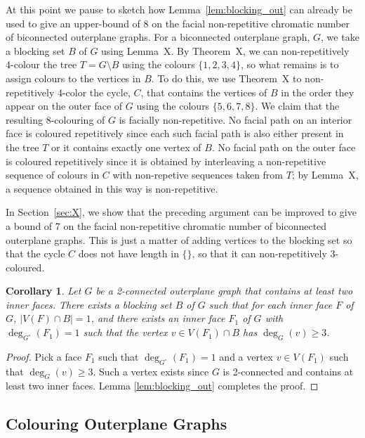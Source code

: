 \documentclass{patmorin}
\newcommand{\wdual}[1]{#1^{\circ}}
\newtheorem{corollary}[theorem]{Corollary}
\begin{document}
At this point we pause to sketch how Lemma~\ref{lem:blocking_out}
can already be used to give an upper-bound of 8 on the facial
non-repetitive chromatic number of biconnected outerplane graphs.
For a biconnected outerplane graph, $G$, we take a blocking set $B$
of $G$ using Lemma~X.  By Theorem~X, we can non-repetitively 4-colour the tree
$T=G\setminus B$ using the colours $\{1,2,3,4\}$, so what remains is to assign
colours to the vertices in $B$.  To do this, we use Theorem~X to non-repetitively 4-color
the cycle, $C$, that contains the vertices of $B$ in the order they appear on
the outer face of $G$ using the colours $\{5,6,7,8\}$.  We claim that
the resulting 8-colouring of $G$ is facially non-repetitive.  No facial
path on an interior face is coloured repetitively since each such facial path
is also either present in the tree $T$ or it contains exactly one
vertex of $B$.  No facial path on the outer face is coloured repetitively
since it is obtained by interleaving a non-repetitive sequence of colours in $C$ with non-repetive sequences taken from $T$; by Lemma~X, a sequence obtained in this way is non-repetitive.

In Section~\ref{sec:X}, we show that the preceding argument can be
improved to give a bound of 7 on the facial non-repetitive chromatic
number of biconnected outerplane graphs. This is just a matter of adding
vertices to the blocking set so that the cycle $C$ does not have length
in $\{\}$, so that it can non-repetitively 3-coloured. 
\begin{corollary}
 Let $G$ be a 2-connected outerplane graph that contains at least two inner faces. There exists a blocking set $B$ of $G$ such that for each inner face $F$ of $G$, $|V(F) \cap B|=1$, and there exists an inner face $F_1$ of $G$ with $\deg_{\wdual{G}}(F_1)=1$ such that the vertex $v \in V(F_1) \cap B$ has $\deg_G(v) \geq 3$.
  \label{cor:blocking_out_select}
\end{corollary}

\begin{proof}
  Pick a face $F_1$ such that $\deg_{\wdual{G}}(F_1)=1$ and a vertex $v \in V(F_1)$ such that $\deg_G(v) \geq 3$. Such a vertex exists since $G$ is 2-connected and contains at least two inner faces. Lemma \ref{lem:blocking_out} completes the proof. 
\end{proof}

\subsection{Colouring Outerplane Graphs}
\end{document}
